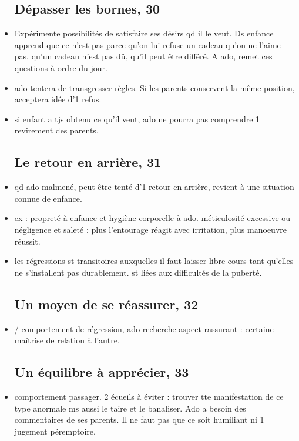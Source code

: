 \documentclass[12pt]{report}
\begin{document}
\begin{itemize}
\subsection{Dépasser les bornes, 30}

\item Expérimente possibilités de satisfaire ses désirs qd il le veut. Ds enfance apprend que ce n'est pas parce qu'on lui refuse un cadeau qu'on ne l'aime pas, qu'un cadeau n'est pas dû, qu'il peut être différé.  A ado, remet ces questions à ordre du jour. \\

\item ado tentera de transgresser règles.  Si les parents conservent la même position, acceptera idée d'1 refus. \\

\item  si enfant a tjs obtenu ce qu'il veut, ado ne pourra pas comprendre 1 revirement des parents.  \\


\subsection{Le retour en arrière, 31}

\item qd ado malmené, peut être tenté d'1 retour en arrière, revient à une situation connue de enfance. \\
\item ex : propreté à enfance et hygiène corporelle à ado.  méticulosité excessive ou négligence et saleté : plus l'entourage réagit avec irritation, plus manoeuvre réussit. \\
\item les régressions st transitoires auxquelles il faut laisser libre cours tant qu'elles ne s'installent pas durablement. st liées aux difficultés de la puberté. \\

\subsection{Un moyen de se réassurer, 32}
\item / comportement de régression, ado recherche aspect rassurant : certaine maîtrise de relation à l'autre. 


\subsection{Un équilibre à apprécier, 33}
\item comportement passager.  2 écueils à éviter :  trouver tte manifestation de ce type anormale ms aussi le taire et le banaliser.  Ado a besoin des commentaires de ses parents. Il ne faut pas que ce soit humiliant ni 1 jugement péremptoire. \\



\end{itemize}
\end{document}

